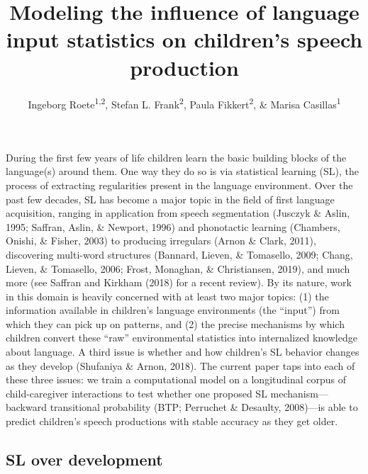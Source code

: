 \documentclass[man,mask,floatsintext]{apa6}
\title{Modeling the influence of language input statistics on children's speech
production}
\author{Ingeborg Roete\textsuperscript{1,2}, Stefan L. Frank\textsuperscript{2},
Paula Fikkert\textsuperscript{2}, \& Marisa Casillas\textsuperscript{1}}
\date{}
\affiliation{
\vspace{0.5cm}
\textsuperscript{1} Max Planck Institute for Psycholinguistics\\\textsuperscript{2} Radboud University}
\begin{document}
\maketitle

During the first few years of life children learn the basic building
blocks of the language(s) around them. One way they do so is via
statistical learning (SL), the process of extracting regularities
present in the language environment. Over the past few decades, SL has
become a major topic in the field of first language acquisition, ranging
in application from speech segmentation (Jusczyk \& Aslin, 1995;
Saffran, Aslin, \& Newport, 1996) and phonotactic learning (Chambers,
Onishi, \& Fisher, 2003) to producing irregulars (Arnon \& Clark, 2011),
discovering multi-word structures (Bannard, Lieven, \& Tomasello, 2009;
Chang, Lieven, \& Tomasello, 2006; Frost, Monaghan, \& Christiansen,
2019), and much more (see Saffran and Kirkham (2018) for a recent
review). By its nature, work in this domain is heavily concerned with at
least two major topics: (1) the information available in children's
language environments (the \enquote{input}) from which they can pick up
on patterns, and (2) the precise mechanisms by which children convert
these \enquote{raw} environmental statistics into internalized knowledge
about language. A third issue is whether and how children's SL behavior
changes as they develop (Shufaniya \& Arnon, 2018). The current paper
taps into each of these three issues: we train a computational model on
a longitudinal corpus of child-caregiver interactions to test whether
one proposed SL mechanism---backward transitional probability (BTP;
Perruchet \& Desaulty, 2008)---is able to predict children's speech
productions with stable accuracy as they get older.

\subsection{SL over development}\label{sl-over-development}
\end{document}
